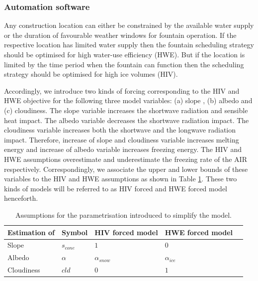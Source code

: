 \documentclass[tc, manuscript]{copernicus}
\begin{document}
\subsubsection{Automation software}

Any construction location can either be constrained by the available water supply or the duration of favourable
weather windows for fountain operation. If the respective location has limited water supply then the fountain
scheduling strategy should be optimised for high water-use efficiency (HWE). But if the location is limited by
the time period when the fountain can function then the scheduling strategy should be optimised for high ice
volumes (HIV).

Accordingly, we introduce two kinds of forcing corresponding to the HIV and HWE objective for the following
three model variables: (a) slope , (b) albedo and (c) cloudiness. The slope variable increases the shortwave
radiation and sensible heat impact. The albedo variable decreases the shortwave radiation impact. The cloudiness
variable increases both the shortwave and the longwave radiation impact. Therefore, increase of slope and
cloudiness variable increases melting energy and increase of albedo variable increases freezing energy. The HIV
and HWE assumptions overestimate and underestimate the freezing rate of the AIR respectively. Correspondingly,
we associate the upper and lower bounds of these variables to the HIV and HWE assumptions as shown in Table
\ref{tab:assumptions}. These two kinds of models will be referred to as HIV forced and HWE forced model
henceforth.

\begin{table}[]
\centering
\caption{Assumptions for the parametrisation introduced to simplify the model.}
\label{tab:assumptions}
\begin{tabular}{@{}lllll@{}}
\toprule
\textbf{Estimation of} & \textbf{Symbol} & \textbf{HIV forced model} & \textbf{HWE forced model} & \\ \midrule
\multicolumn{1}{|l}{Slope}        & $s_{cone}$ & $ 1 $ & $0$ & \multicolumn{1}{l|}{} \\ \midrule
\multicolumn{1}{|l}{Albedo} & $\alpha$ & $\alpha_{snow}$ & $\alpha_{ice}$ & \multicolumn{1}{l|}{} \\\midrule 
\multicolumn{1}{|l}{Cloudiness}  & $cld$ & $0$ & $1$ & \multicolumn{1}{l|}{} \\ \bottomrule
\end{tabular}
\end{table}
\end{document}

